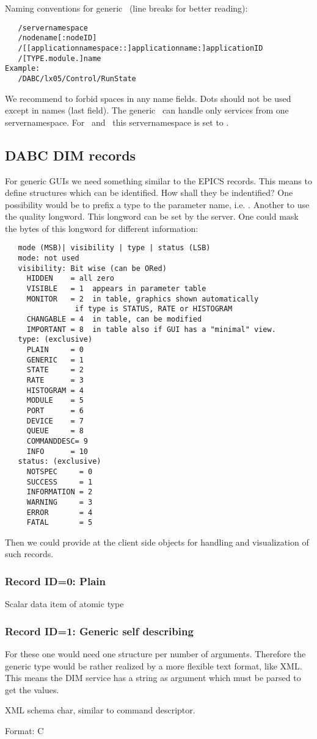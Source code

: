 Naming conventions for generic \gui~(line breaks for better reading):
\begin{verbatim}
   /servernamespace
   /nodename[:nodeID]
   /[[applicationnamespace::]applicationname:]applicationID
   /[TYPE.module.]name
Example:
   /DABC/lx05/Control/RunState
\end{verbatim}
We recommend to forbid spaces in any name fields. Dots should not be used except in names (last field). The generic \gui~can handle only services from one servernamespace. For \dabc~and \mbs~this servernamespace is set to .
\subsection{DABC DIM records}
For generic GUIs we need something similar to the EPICS records. This means to define structures which can be identified. How shall they be indentified? One possibility would be to prefix a type to the parameter name, i.e. . Another to use the quality longword. This longword can be set by the server. One could mask the bytes of this longword for different information:
\begin{verbatim}
   mode (MSB)| visibility | type | status (LSB)
   mode: not used
   visibility: Bit wise (can be ORed)
     HIDDEN    = all zero
     VISIBLE   = 1  appears in parameter table
     MONITOR   = 2  in table, graphics shown automatically 
     			if type is STATUS, RATE or HISTOGRAM
     CHANGABLE = 4  in table, can be modified
     IMPORTANT = 8  in table also if GUI has a "minimal" view.
   type: (exclusive)
     PLAIN     = 0
     GENERIC   = 1
     STATE     = 2
     RATE      = 3
     HISTOGRAM = 4
     MODULE    = 5
     PORT      = 6
     DEVICE    = 7
     QUEUE     = 8
     COMMANDDESC= 9
     INFO      = 10
   status: (exclusive) 
     NOTSPEC     = 0
     SUCCESS     = 1
     INFORMATION = 2
     WARNING     = 3
     ERROR       = 4
     FATAL       = 5
\end{verbatim}

Then we could provide at the client side objects for handling and visualization of such records.

\subsubsection{Record ID=0: Plain}

Scalar data item of atomic type

\subsubsection{Record ID=1: Generic self describing}
For these one would need one structure per number of arguments. Therefore the generic type would be rather realized by a more flexible text format, like XML. This means the DIM service has a string as argument which must be parsed to get the values.
\begin{compactdesc}
\item[XML schema] char, similar to command descriptor.
\item[Format:] C
\end{compactdesc}

